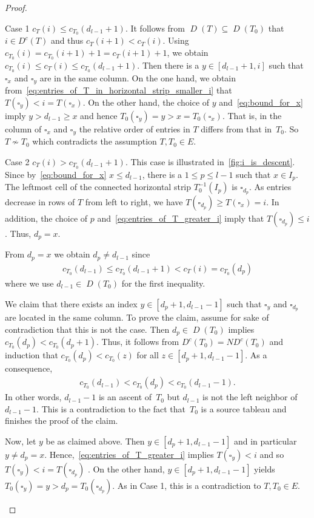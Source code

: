 \documentclass[10pt]{amsart}
\theoremstyle{plain}
\theoremstyle{plain}
\theoremstyle{plain}
\theoremstyle{plain}
\theoremstyle{plain}
\theoremstyle{definition}
\theoremstyle{definition}
\newenvironment{enonce*}[2][]{\par\smallskip\noindent\textbf{#2}.\par\nobreak}{\par\smallskip}
\newcommand{\D}{\operatorname{\mathit{D}}}
\newcommand{\DC}{\operatorname{\mathit{D^c}}}
\newcommand{\ND}{\operatorname{\mathit{ND^c}}}
\newcommand{\cell}{\square}
\begin{document}
\begin{proof}
\begin{enonce*}[remark]{Case 1} 
$c_T(i) \leq c_{T_0}(d_{l-1}+1)$. It follows from $\D(T) \subseteq \D(T_0)$ that $i\in \DC(T)$ and thus $c_T(i+1) < c_T(i) $. 
	Using $c_{T_0}(i) = c_{T_0}(i+1) + 1 = c_{T}(i+1) + 1$, we obtain
	$c_{T_0}(i) \leq c_T(i) \leq c_{T_0}(d_{l-1}+1).$
	Then there is a $y\in [d_{l-1}+1, i]$ such that $\cell_x$ and $\cell_y$ are in the same column. 
	On the one hand, we obtain from~\eqref{eq:entries_of_T_in_horizontal_strip_smaller_i} that $T(\cell_y) < i = T(\cell_x)$. 
	On the other hand, the choice of $y$ and~\eqref{eq:bound_for_x} imply $y>d_{l-1} \geq x$ and hence $T_0(\cell_y) =y> x = T_0(\cell_x)$.	
	That is, in the column of $\cell_x$ and $\cell_y$ the relative order of entries in $T$ differs from that in~$T_0$.
	So $T\not \sim T_0$ which contradicts the assumption $T,T_0 \in E$.
	\end{enonce*}
\begin{enonce*}[remark]{Case 2} 
	$c_T(i) > c_{T_0}(d_{l-1}+1)$. This case is illustrated in~\cref{fig:i_is_descent}. Since by~\eqref{eq:bound_for_x} $x\leq d_{l-1}$, there is a $1\leq p\leq l-1$ such that $x\in I_p$.
	The leftmost cell of the connected horizontal strip $T^{-1}_0(I_p)$ is $\cell_{d_p}$. As entries decrease in rows of $T$ from left to right, we have $T(\cell_{d_p})\geq T(\cell_x) = i$. In addition, the choice of $p$ and~\eqref{eq:entries_of_T_greater_i} imply that $T(\cell_{d_p})\leq i$. Thus, $d_p=x$.
	
	From $d_p=x$ we obtain $d_p \neq d_{l-1}$ since
	\begin{align*}
	c_{T_0}(d_{l-1}) \leq c_{T_0}(d_{l-1}+1) < c_T(i) = c_{T_0}(d_p)
	\end{align*}
	where we use $d_{l-1}\in \D(T_0)$ for the first inequality.
	
	We claim that there exists an index $y\in [d_p +1, d_{l-1} -1]$ such that $\cell_y$ and $\cell_{d_p}$ are located in the same column.
	To prove the claim, assume for sake of contradiction that this is not the case. Then $d_p \in \D(T_0)$ implies $ c_{T_0}(d_p)< c_{T_0}(d_p+1)$. Thus, it follows from $\DC(T_0)= \ND(T_0)$ and induction that $c_{T_0}(d_p)< c_{T_0}(z)$ for all ${z\in[d_p+1,d_{l-1} -1]}$. As a consequence,
		\begin{align*}
		c_{T_0}(d_{l-1}) < c_{T_0}(d_p) < c_{T_0}(d_{l-1}-1).
		\end{align*}
		In other words, $d_{l-1}-1$ is an ascent of~$T_0$
		but $d_{l-1}$ is not the left neighbor of $d_{l-1}-1$.	
		 This is a contradiction to the fact that~$T_0$ is a source tableau and finishes the proof of the claim.
	
	Now, let $y$ be as claimed above. Then $y\in [d_p +1, d_{l-1} -1]$ and in particular $y\neq d_p= x$. Hence,~\eqref{eq:entries_of_T_greater_i} implies $T(\cell_y) <i$ and so $T(\cell_y) < i = T(\cell_{d_p})$ . 
 On the other hand, $y\in [d_p +1, d_{l-1} -1]$ yields $T_0(\cell_y) =y > d_p = T_0(\cell_{d_p})$. As in Case 1, this is a contradiction to $T,T_0\in E$.\qedhere
\end{enonce*}
\end{proof}
\end{document}
